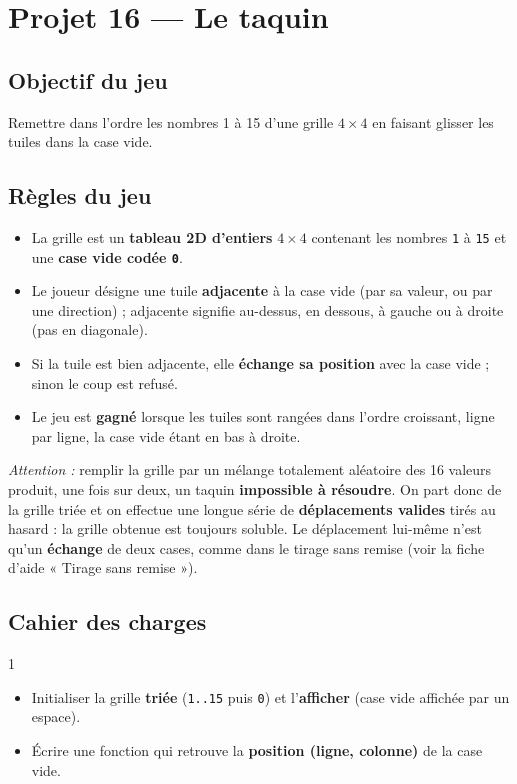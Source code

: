 \section{Projet 16 — Le taquin}
\setcounter{UPSTInumeroCahier des charges}{0}

\subsection*{Objectif du jeu}
Remettre dans l'ordre les nombres 1 à 15 d'une grille $4\times4$ en faisant glisser les tuiles dans la case vide.

\subsection*{Règles du jeu}
\begin{itemize}
  \item La grille est un \textbf{tableau 2D d'entiers} $4\times4$ contenant les nombres \texttt{1} à \texttt{15} et une \textbf{case vide codée \texttt{0}}.
  \item Le joueur désigne une tuile \textbf{adjacente} à la case vide (par sa valeur, ou par une direction) ; adjacente signifie au-dessus, en dessous, à gauche ou à droite (pas en diagonale).
  \item Si la tuile est bien adjacente, elle \textbf{échange sa position} avec la case vide ; sinon le coup est refusé.
  \item Le jeu est \textbf{gagné} lorsque les tuiles sont rangées dans l'ordre croissant, ligne par ligne, la case vide étant en bas à droite.
\end{itemize}

\textit{Attention :} remplir la grille par un mélange totalement aléatoire des 16 valeurs produit, une fois sur deux, un taquin \textbf{impossible à résoudre}. On part donc de la grille triée et on effectue une longue série de \textbf{déplacements valides} tirés au hasard : la grille obtenue est toujours soluble. Le déplacement lui-même n'est qu'un \textbf{échange} de deux cases, comme dans le tirage sans remise (voir la fiche d'aide « Tirage sans remise »).

\subsection*{Cahier des charges}
\begin{UPSTICahierDesCharges}{1}
\begin{itemize}
  \item Initialiser la grille \textbf{triée} (\texttt{1..15} puis \texttt{0}) et l'\textbf{afficher} (case vide affichée par un espace).
  \item Écrire une fonction qui retrouve la \textbf{position (ligne, colonne)} de la case vide.
\end{itemize}
\end{UPSTICahierDesCharges}

